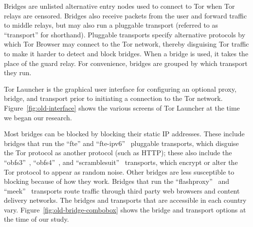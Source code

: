 \documentclass[USenglish,oneside,twocolumn]{article}
\begin{document}
Bridges are unlisted alternative entry nodes used to connect to Tor when Tor relays are censored.
Bridges also receive packets from the user and forward traffic to middle relays, but may also run a pluggable transport (referred to as ``transport'' for shorthand). Pluggable transports specify alternative protocols by which Tor Browser may connect to the Tor network, thereby disguising Tor traffic to make it harder to detect and block bridges.
When a bridge is used, it takes the place of the guard relay.
For convenience, bridges are grouped by which transport they run. 

Tor Launcher is the graphical user interface for configuring
an optional proxy, bridge, and transport
prior to initiating a connection to the Tor network.
Figure~\ref{fig:old-interface} shows the various screens
of Tor Launcher at the time we began our research.

Most bridges can be blocked by blocking their static IP addresses. These include bridges that run the ``fte'' and ``fte-ipv6''~\cite{fte} pluggable transports, which disguise the Tor protocol as another protocol (such as HTTP); these also include the ``obfs3''~\cite{obfs3}, ``obfs4''~\cite{obfs4}, and ``scramblesuit''~\cite{scramblesuit} transports, which encrypt or alter the Tor protocol to appear as random noise. Other bridges are less susceptible to blocking because of how they work. Bridges that run the ``flashproxy''~\cite{flashproxy} and ``meek''~\cite{fifield2015blocking} transports route traffic through third party web browsers and content delivery networks. The bridges and transports that are accessible in each country vary. Figure~\ref{fig:old-bridge-combobox} shows the bridge and transport options at the time of our study. 
\end{document}
